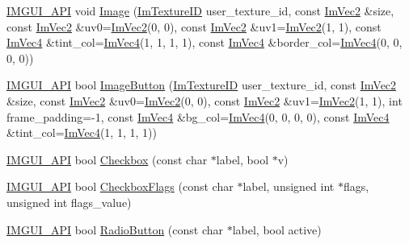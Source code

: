 \begin{DoxyCompactItemize}
\item 
\mbox{\hyperlink{imgui_8h_a43829975e84e45d1149597467a14bbf5}{I\+M\+G\+U\+I\+\_\+\+A\+PI}} void \mbox{\hyperlink{namespace_im_gui_ad8705ac3b718c1b2e84e7b8c34f90249}{Image}} (\mbox{\hyperlink{imgui_8h_a364f4447ecbc4ca176145ccff9db6286}{Im\+Texture\+ID}} user\+\_\+texture\+\_\+id, const \mbox{\hyperlink{struct_im_vec2}{Im\+Vec2}} \&size, const \mbox{\hyperlink{struct_im_vec2}{Im\+Vec2}} \&uv0=\mbox{\hyperlink{struct_im_vec2}{Im\+Vec2}}(0, 0), const \mbox{\hyperlink{struct_im_vec2}{Im\+Vec2}} \&uv1=\mbox{\hyperlink{struct_im_vec2}{Im\+Vec2}}(1, 1), const \mbox{\hyperlink{struct_im_vec4}{Im\+Vec4}} \&tint\+\_\+col=\mbox{\hyperlink{struct_im_vec4}{Im\+Vec4}}(1, 1, 1, 1), const \mbox{\hyperlink{struct_im_vec4}{Im\+Vec4}} \&border\+\_\+col=\mbox{\hyperlink{struct_im_vec4}{Im\+Vec4}}(0, 0, 0, 0))
\item 
\mbox{\hyperlink{imgui_8h_a43829975e84e45d1149597467a14bbf5}{I\+M\+G\+U\+I\+\_\+\+A\+PI}} bool \mbox{\hyperlink{namespace_im_gui_ac79ef64e8b9e1db73d8237f6a999da14}{Image\+Button}} (\mbox{\hyperlink{imgui_8h_a364f4447ecbc4ca176145ccff9db6286}{Im\+Texture\+ID}} user\+\_\+texture\+\_\+id, const \mbox{\hyperlink{struct_im_vec2}{Im\+Vec2}} \&size, const \mbox{\hyperlink{struct_im_vec2}{Im\+Vec2}} \&uv0=\mbox{\hyperlink{struct_im_vec2}{Im\+Vec2}}(0, 0), const \mbox{\hyperlink{struct_im_vec2}{Im\+Vec2}} \&uv1=\mbox{\hyperlink{struct_im_vec2}{Im\+Vec2}}(1, 1), int frame\+\_\+padding=-\/1, const \mbox{\hyperlink{struct_im_vec4}{Im\+Vec4}} \&bg\+\_\+col=\mbox{\hyperlink{struct_im_vec4}{Im\+Vec4}}(0, 0, 0, 0), const \mbox{\hyperlink{struct_im_vec4}{Im\+Vec4}} \&tint\+\_\+col=\mbox{\hyperlink{struct_im_vec4}{Im\+Vec4}}(1, 1, 1, 1))
\item 
\mbox{\hyperlink{imgui_8h_a43829975e84e45d1149597467a14bbf5}{I\+M\+G\+U\+I\+\_\+\+A\+PI}} bool \mbox{\hyperlink{namespace_im_gui_a57d73c1d0ef807fef734d91024092027}{Checkbox}} (const char $\ast$label, bool $\ast$v)
\item 
\mbox{\hyperlink{imgui_8h_a43829975e84e45d1149597467a14bbf5}{I\+M\+G\+U\+I\+\_\+\+A\+PI}} bool \mbox{\hyperlink{namespace_im_gui_aeca400dcf5a82c312b3e669d2fe6e88d}{Checkbox\+Flags}} (const char $\ast$label, unsigned int $\ast$flags, unsigned int flags\+\_\+value)
\item 
\mbox{\hyperlink{imgui_8h_a43829975e84e45d1149597467a14bbf5}{I\+M\+G\+U\+I\+\_\+\+A\+PI}} bool \mbox{\hyperlink{namespace_im_gui_a6b146763845cbad5a4144772279631bc}{Radio\+Button}} (const char $\ast$label, bool active)
\item 

\end{DoxyCompactItemize}
